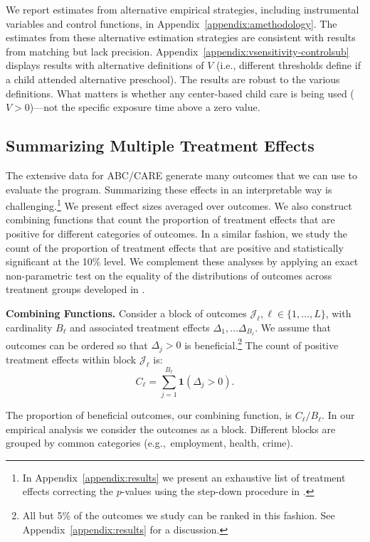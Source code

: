 We report estimates from alternative empirical strategies, including instrumental variables and control functions, in Appendix~\ref{appendix:amethodology}. The estimates from these alternative estimation strategies are consistent with results from matching but lack precision. Appendix~\ref{appendix:vsensitivity-controlsub} displays results with alternative definitions of $V$ (i.e., different thresholds define if a child attended alternative preschool). The results are robust to the various definitions. What matters is whether any center-based child care is being used ($V>0$)---not the specific exposure time above a zero value.

\subsection{Summarizing Multiple Treatment Effects}\label{sec:combining-functions}

The extensive data for ABC/CARE generate many outcomes that we can use to evaluate the program. Summarizing these effects in an interpretable way is challenging.\footnote{In Appendix~\ref{appendix:results} we present an exhaustive list of treatment effects correcting the $p$-values using the step-down procedure in \citet{Romano_Wolf_2016_pval_SaPL}.} We present effect sizes averaged over outcomes. We also construct combining functions that count the proportion of treatment effects that are positive for different categories of outcomes. In a similar fashion, we study the count of the proportion of treatment effects that are positive and statistically significant at the 10\% level. We complement these analyses by applying an exact non-parametric test on the equality of the distributions of outcomes across treatment groups developed in \citet{Rosenbaum_2005_Distribution_JRSS}.

\textbf{Combining Functions.} Consider a block of outcomes $\mathcal{J}_{\ell}, \ell \in \{1,\dots ,L\}$, with cardinality $B_{\ell}$ and  associated treatment effects $\Delta_1, \ldots \Delta_{B_\ell}$. We assume that outcomes can be ordered so that $\Delta_{j} >0$ is beneficial.\footnote{All but 5\% of the outcomes we study can be ranked in this fashion. See Appendix~\ref{appendix:results} for a discussion.} The count of positive treatment effects within block $\mathcal{J}_{\ell}$ is:
\begin{equation}
C_\ell = \sum^{B_\ell}_{j=1} \bm{1} (\Delta_{j} >0).
\end{equation}

\noindent The proportion of beneficial outcomes, our combining function, is $C_\ell / B_\ell$. In our empirical analysis we consider the outcomes as a block. Different blocks are grouped by common categories (e.g.,\ employment, health, crime).

